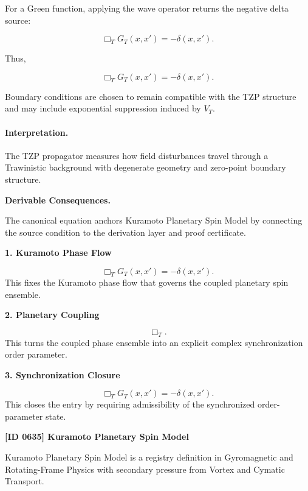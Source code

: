 For a Green function, applying the wave operator returns the negative delta source:

\begin{equation}
\Box_T G_T(x,x')
=
-\delta(x,x') .
\end{equation}

Thus,

\begin{equation}
\boxed{
\Box_T G_T(x,x')
=
-\delta(x,x') .
}
\end{equation}

Boundary conditions are chosen to remain compatible with the TZP structure and may include exponential suppression induced by $V_T$.

\paragraph{Interpretation.}
The TZP propagator measures how field disturbances travel through a Trawinistic background with degenerate geometry and zero-point boundary structure.

\par\vspace{0.35em}
\noindent\textbf{Derivable Consequences.}\quad
\begingroup
\footnotesize
\raggedright
The canonical equation anchors Kuramoto Planetary Spin Model by connecting the source condition to the derivation layer and proof certificate.
\par\endgroup

\noindent\textbf{1. Kuramoto Phase Flow}\par
\[
\Box_T G_T(x,x') = -\delta(x,x').
\]
\noindent This fixes the Kuramoto phase flow that governs the coupled planetary spin ensemble.\par
\noindent\textbf{2. Planetary Coupling}\par
\[
\Box_T.
\]
\noindent This turns the coupled phase ensemble into an explicit complex synchronization order parameter.\par
\noindent\textbf{3. Synchronization Closure}\par
\[
\boxed{ \Box_T G_T(x,x') = -\delta(x,x'). }
\]
\noindent This closes the entry by requiring admissibility of the synchronized order-parameter state.\par

\clearpage
\noindent\textbf{[ID 0635] Kuramoto Planetary Spin Model}\par
\vspace{0.35em}
\begingroup\small
{}
Kuramoto Planetary Spin Model is a registry definition in Gyromagnetic and Rotating-Frame Physics with secondary pressure from Vortex and Cymatic Transport.

